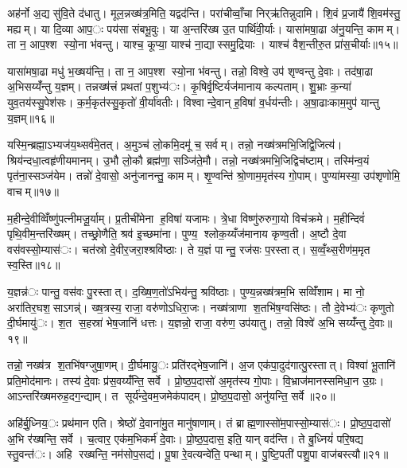 अह॑र्नो अ॒द्य सु॑वि॒ते द॑धातु। मूल॒न्नख्ष॑त्र॒मिति॒ यद्वद॑न्ति। परा॑चीव्वाँ॒चा निर्‌ऋ॑तिन्नुदामि। शि॒वं प्र॒जायै॑ शि॒वम॑स्तु॒ मह्यम्। या दि॒व्या आप॒ः पय॑सा संबभू॒वुः। या अ॒न्तरि॑ख्ष उ॒त पार्थि॑वी॒र्याः। यासा॑मषा॒ढा अ॑नु॒यन्ति॒ कामम्। ता न॒ आप॒श्श स्यो॒ना भ॑वन्तु। याश्च॒ कूप्या॒ याश्च॑ ना॒द्यास्समु॒द्रियाः। याश्च॑ वैश॒न्तीरु॒त प्रा॑स॒चीर्याः॥१५॥

यासा॑मषा॒ढा मधु॑ भ॒ख्षय॑न्ति॒। ता न॒ आप॒श्श स्यो॒ना भ॑वन्तु। तन्नो॒ विश्वे॒ उप॑ शृण्वन्तु दे॒वाः। तद॑षा॒ढा अ॒भिसय्यँ॑न्तु य॒ज्ञम्। तन्नख्ष॑त्त्रं प्रथतां प॒शुभ्य॑ः। कृ॒षिर्वृ॒ष्टिर्यज॑मानाय कल्पताम्। शु॒भ्राः क॒न्या॑ युव॒तय॑स्सु॒पेश॑सः। क॒र्म॒कृत॑स्सु॒कृतो॑ वी॒र्या॑वतीः। विश्वान्दे॒वान् ह॒विषा॑ व॒र्धय॑न्तीः। अ॒षा॒ढाःकाम॒मुप॑ यान्तु य॒ज्ञम्॥१६॥

यस्मि॒न्ब्रह्मा॒ऽभ्यज॑य॒थ्सर्व॑मे॒तत्। अ॒मुञ्च॑ लो॒कमि॒दमू॑ च॒ सर्वम्। तन्नो॒ नख्ष॑त्रमभि॒जिद्वि॒जित्य॑। श्रिय॑न्दधा॒त्वहृ॑णीयमानम्। उ॒भौ लो॒कौ ब्रह्म॑णा॒ सञ्जि॑ते॒मौ। तन्नो॒ नख्ष॑त्रमभि॒जिद्विच॑ष्टाम्। तस्मि॑न्व॒यं पृत॑ना॒स्सञ्ज॑येम। तन्नो॑ दे॒वासो॒ अनु॑जानन्तु॒ कामम्। शृ॒ण्वन्ति॑ श्रो॒णाम॒मृत॑स्य गो॒पाम्। पुण्या॑मस्या॒ उप॑शृणोमि॒ वाचम्॥१७॥

म॒हीन्दे॒वीव्विँष्णु॑पत्नीमजू॒र्याम्। प्र॒तीची॑मेना ह॒विषा॑ यजामः। त्रे॒धा विष्णु॑रुरुगा॒यो विच॑क्रमे। म॒हीन्दिवं॑ पृथि॒वीम॒न्तरि॑ख्षम्। तच्छ्रो॒णैति॒ श्रव॑ इ॒च्छमा॑ना। पुण्य॒ श्लोक॒य्यँज॑मानाय कृण्व॒ती। अ॒ष्टौ दे॒वा वस॑वस्सो॒म्यास॑ः। चत॑स्रो दे॒वीर॒जरा॒श्श्रवि॑ष्ठाः। ते य॒ज्ञं पान्तु॒ रज॑सः प॒रस्तात्। स॒व्वँ॒थ्स॒रीण॑म॒मृत स्व॒स्ति॥१८॥

य॒ज्ञन्न॑ः पान्तु॒ वस॑वः पु॒रस्तात्। द॒ख्षि॒ण॒तो॑ऽभिय॑न्तु॒ श्रवि॑ष्ठाः। पुण्य॒न्नख्ष॑त्रम॒भि सव्विँ॑शाम। मा नो॒ अरा॑तिर॒घश॒साऽगन्न्॑। ख्ष॒त्रस्य॒ राजा॒ वरु॑णोऽधिरा॒जः। नख्ष॑त्राणा श॒तभि॑ष॒ग्वसि॑ष्ठः। तौ दे॒वेभ्य॑ः कृणुतो दी॒र्घमायु॑ः। श॒त स॒हस्रा॑ भेष॒जानि॑ धत्तः। य॒ज्ञन्नो॒ राजा॒ वरु॑ण॒ उप॑यातु। तन्नो॒ विश्वे॑ अ॒भि सय्यँ॑न्तु दे॒वाः॥१९॥

तन्नो॒ नख्ष॑त्र श॒तभि॑षग्जुषा॒णम्। दी॒र्घमायु॒ः प्रति॑रद्भेष॒जानि॑। अ॒ज एक॑पा॒दुद॑गात्पु॒रस्तात्। विश्वा॑ भू॒तानि॑ प्रति॒मोद॑मानः। तस्य॑ दे॒वाः प्र॑स॒वय्यँ॑न्ति॒ सर्वे। प्रो॒ष्ठ॒प॒दासो॑ अ॒मृत॑स्य गो॒पाः। वि॒भ्राज॑मानस्समिधा॒न उ॒ग्रः। आऽन्तरि॑ख्षमरुह॒दग॒न्द्याम्। त सूर्य॑न्दे॒वम॒जमेक॑पादम्। प्रो॒ष्ठ॒प॒दासो॒ अनु॑यन्ति॒ सर्वे॥२०॥

अहि॑र्बु॒ध्निय॒ः प्रथ॑मान एति। श्रेष्ठो॑ दे॒वाना॑मु॒त मानु॑षाणाम्। तं ब्राह्म॒णास्सो॑म॒पास्सो॒म्यास॑ः। प्रो॒ष्ठ॒प॒दासो॑ अ॒भि र॑ख्षन्ति॒ सर्वे। च॒त्वार॒ एक॑म॒भिकर्म॑ दे॒वाः। प्रो॒ष्ठ॒प॒दास॒ इति॒ यान् वद॑न्ति। ते बु॒ध्नियं॑ परि॒षद्य स्तु॒वन्त॑ः। अहि रख्षन्ति॒ नम॑सोप॒सद्य॑। पू॒षा रे॒वत्यन्वे॑ति॒ पन्थाम्। पु॒ष्टि॒पती॑ पशु॒पा वाज॑बस्त्यौ॥२१॥

